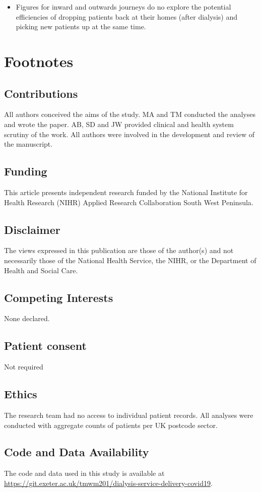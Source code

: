 \begin{multicols}{2}
\begin{itemize}
    \item Figures for inward and outwards journeys do no explore the potential efficiencies of dropping patients back at their homes (after dialysis) and picking new patients up at the same time.
\end{itemize}

\section*{Footnotes}
\subsection*{Contributions}
All authors conceived the aims of the study. MA and TM conducted the analyses and wrote the paper. AB, SD and JW provided clinical and health system scrutiny of the work. All authors were involved in the development and review of the manuscript.

\subsection*{Funding}
This article presents independent research funded by the National Institute for Health Research (NIHR) Applied Research Collaboration South West Peninsula. 

\subsection*{Disclaimer}
The views expressed in this publication are those of the author(s) and not necessarily those of the National Health Service, the NIHR, or the Department of Health and Social Care.

\subsection*{Competing Interests}
None declared.

\subsection*{Patient consent}
Not required

\subsection*{Ethics}
The research team had no access to individual patient records.  All analyses were conducted with aggregate counts of patients per UK postcode sector. 

\subsection*{Code and Data Availability}
The code and data used in this study is available at \url{https://git.exeter.ac.uk/tmwm201/dialysis-service-delivery-covid19}.




\end{multicols}


%
%
\printbibliography
